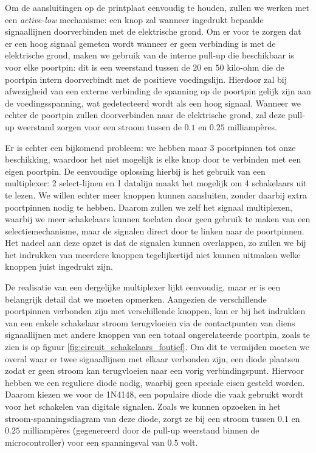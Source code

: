 \documentclass[verslag.tex]{subfiles}
\begin{document}
Om de aansluitingen op de printplaat eenvoudig te houden, zullen we werken met een \emph{active-low} mechanisme: een knop zal wanneer ingedrukt bepaalde signaallijnen doorverbinden met de elektrische grond. Om er voor te zorgen dat er een hoog signaal gemeten wordt wanneer er geen verbinding is met de elektrische grond, maken we gebruik van de interne pull-up die beschikbaar is voor elke poortpin: dit is een weerstand tussen de $20$ en $50$ kilo-ohm die de poortpin intern doorverbindt met de positieve voedingslijn. Hierdoor zal bij afwezigheid van een externe verbinding de spanning op de poortpin gelijk zijn aan de voedingsspanning, wat gedetecteerd wordt als een hoog signaal. Wanneer we echter de poortpin zullen doorverbinden naar de elektrische grond, zal deze pull-up weerstand zorgen voor een stroom tussen de $0.1$ en $0.25$ milliampères.

Er is echter een bijkomend probleem: we hebben maar 3 poortpinnen tot onze beschikking, waardoor het niet mogelijk is elke knop door te verbinden met een eigen poortpin. De eenvoudige oplossing hierbij is het gebruik van een multiplexer: 2 select-lijnen en 1 datalijn maakt het mogelijk om 4 schakelaars uit te lezen. We willen echter meer knoppen kunnen aansluiten, zonder daarbij extra poortpinnen nodig te hebben. Daarom zullen we zelf het signaal multiplexen, waarbij we meer schakelaars kunnen toelaten door geen gebruik te maken van een selectiemechanisme, maar de signalen direct door te linken naar de poortpinnen. Het nadeel aan deze opzet is dat de signalen kunnen overlappen, zo zullen we bij het indrukken van meerdere knoppen tegelijkertijd niet kunnen uitmaken welke knoppen juist ingedrukt zijn.

De realisatie van een dergelijke multiplexer lijkt eenvoudig, maar er is een belangrijk detail dat we moeten opmerken. Aangezien de verschillende poortpinnen verbonden zijn met verschillende knoppen, kan er bij het indrukken van een enkele schakelaar stroom terugvloeien via de contactpunten van diens signaallijnen met andere knoppen van een totaal ongerelateerde poortpin, zoals te zien is op figuur \ref{fig:circuit_schakelaars_foutief}. Om dit te vermijden moeten we overal waar er twee signaallijnen met elkaar verbonden zijn, een diode plaatsen zodat er geen stroom kan terugvloeien naar een vorig verbindingspunt. Hiervoor hebben we een reguliere diode nodig, waarbij geen speciale eisen gesteld worden. Daarom kiezen we voor de 1N4148, een populaire diode die vaak gebruikt wordt voor het schakelen van digitale signalen. Zoals we kunnen opzoeken in het stroom-spanningsdiagram van deze diode, zorgt ze bij een stroom tussen $0.1$ en $0.25$ milliampères (gegenereerd door de pull-up weerstand binnen de microcontroller) voor een spanningsval van $0.5$ volt.
\end{document}
